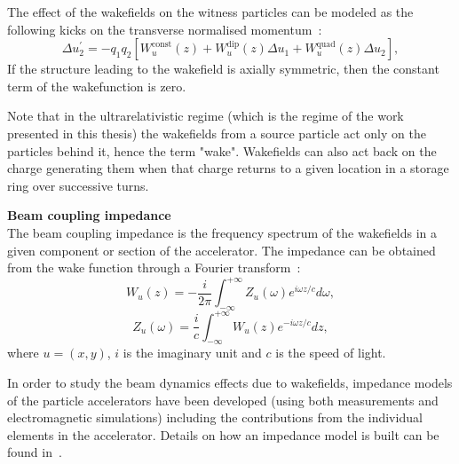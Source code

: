 The effect of the wakefields on the witness particles can be modeled as the following kicks on the transverse normalised momentum~\cite{Schenk:2665819}: %
\begin{equation}\label{eq:wakefield_kicks}
    \Delta u_2^\prime  = -q_1 q_2[W^\mathrm{const}_u(z) + W^\mathrm{dip}_u(z)\Delta u_1 +  W^\mathrm{quad}_u(z)\Delta u_2],
\end{equation}
If the structure leading to the wakefield is axially symmetric, then the constant term of the wakefunction is zero. 

Note that in the ultrarelativistic regime (which is the regime of the work presented in this thesis) the wakefields from a source particle act only on the particles behind it, hence the term "wake". Wakefields can also act back on the charge generating them when that charge returns to a given location in a storage ring over successive turns.

\textbf{Beam coupling impedance}\\
The beam coupling impedance is the frequency spectrum of the wakefields in a given component or section of the accelerator. The impedance can be obtained from the wake function through a Fourier transform~\cite{Chao:collective}: %
\begin{equation}\label{eq:wakes_to_impedance}
    W_u(z) = - \frac{i}{ 2\pi} \int_{- \infty}^{+\infty} Z_u(\omega) e^{i \omega z/c} d\omega,
\end{equation}
\begin{equation}\label{eq:impedance_to_wakes}
    Z_u(\omega) = \frac{i}{c} \int_{- \infty}^{+\infty} W_u(z) e^{-i \omega z/c} dz,
\end{equation}
where $u=(x,y)$, $i$ is the imaginary unit and $c$ is the speed of light.

In order to study the beam dynamics effects due to wakefields, impedance models of the particle accelerators have been developed (using both measurements and electromagnetic simulations) including the contributions from the individual elements in the accelerator. Details on how an impedance model is built can be found in~\cite{benoit_ipac19_impedance}.

